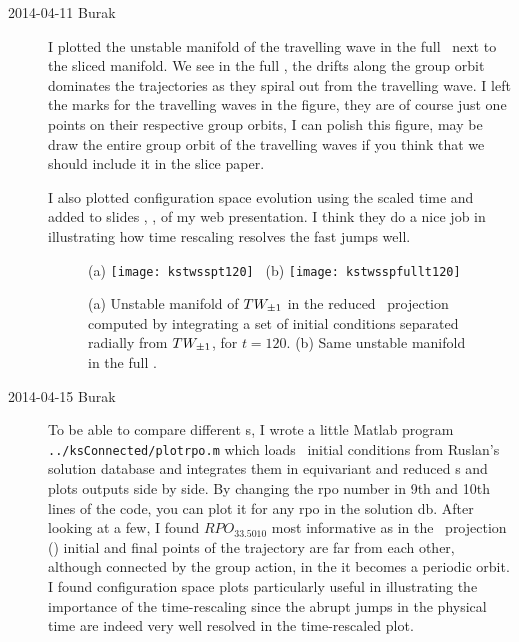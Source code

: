 \begin{description}
\item[2014-04-11 Burak] I plotted the unstable manifold of the travelling
wave in the full \statesp\ next to the sliced manifold. We see in the full
\statesp , the drifts along the group orbit dominates the trajectories as
they spiral out from the travelling wave. I left the marks for the travelling
waves in the figure, they are of course just one points on their respective
group orbits, I can polish this figure, may be draw the entire group orbit
of the travelling waves if you think that we should include it in the slice
paper.

I also plotted configuration space evolution using the scaled time and added
to slides
,
,
of my web presentation. I think they do a nice job in illustrating how time
rescaling resolves the fast jumps well.

\begin{figure}
\begin{center}
 {(a)} \texttt{[image: kstwsspt120]} \,
 {(b)} \texttt{[image: kstwsspfullt120]}
\end{center}
\caption{ (a) Unstable manifold of $TW_{\pm1}$ in the
reduced \statesp\ projection computed
by integrating a set of initial
conditions  separated radially
from $TW_{\pm1}$, for $t=120$.
(b) Same unstable manifold in the full \statesp .
}
\label{f-kstwmansspredfull}
\end{figure}

\item[2014-04-15 Burak] To be able to compare different \rpo s, I wrote
a little Matlab program \texttt{../ksConnected/plotrpo.m} which loads \rpo\
initial conditions from Ruslan's solution database and integrates them in
equivariant and reduced \statesp s and plots outputs side by side. By
changing the rpo number in 9th and 10th lines of the code, you can plot it
for any rpo in the solution db. After looking at a few, I found $RPO_{33.5010}$
most informative as in the \statesp\ projection (\reffig{f-KSrpo335010ssp})
initial and final points of the trajectory are far from each other, although
connected by the group action, in the it becomes a periodic orbit. I found
configuration space plots \reffig{f-KSrpo335010conf} particularly useful
in illustrating the importance of the time-rescaling since the abrupt jumps
in the physical time are indeed very well resolved in the time-rescaled plot.



\end{description}
